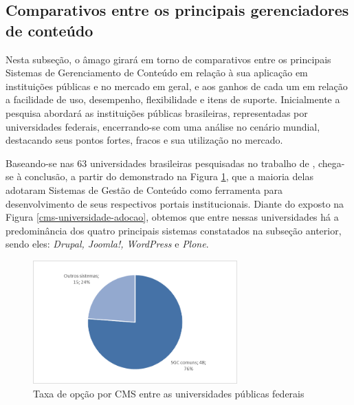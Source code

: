 \hspace{2.5cm}

\subsection{Comparativos entre os principais gerenciadores de conteúdo}
\label{subsec:comparacao}

\hspace{2.5cm}


Nesta subseção, o âmago girará em torno de comparativos entre os principais Sistemas de Gerenciamento de Conteúdo em relação à sua aplicação em instituições públicas e no mercado em geral, e aos ganhos de cada um em relação a facilidade de uso, desempenho, flexibilidade e itens de suporte. Inicialmente a pesquisa abordará as instituições públicas brasileiras, representadas por universidades federais, encerrando-se com uma análise no cenário mundial, destacando seus pontos fortes, fracos e sua utilização no mercado. 

Baseando-se nas 63 universidades brasileiras pesquisadas no trabalho de , chega-se à conclusão, a partir do demonstrado na Figura \ref{cms-universidade-opcao}, que a maioria delas adotaram Sistemas de Gestão de Conteúdo como ferramenta para desenvolvimento de seus respectivos portais institucionais. Diante do exposto na Figura \ref{cms-universidade-adocao}, obtemos que entre nessas universidades há a predominância dos quatro principais sistemas constatados na subseção anterior, sendo eles: \textit{Drupal, Joomla!, WordPress} e \textit{Plone}.

\begin{figure}[htb]
 \centering
 \caption{Taxa de opção por CMS entre as universidades públicas federais}
 \includegraphics[width=0.7\textwidth]{figuras/adocao-de-cms}
 
 \label{cms-universidade-opcao}
\end{figure}

